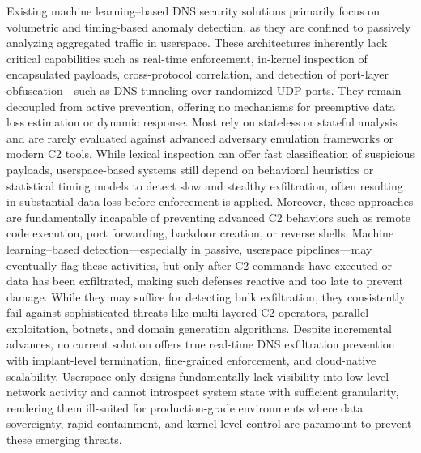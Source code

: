\documentclass [11pt, proquest] {uwthesis}[2020/02/24]
\begin{document}
Existing machine learning–based DNS security solutions primarily focus on volumetric and timing-based anomaly detection, as they are confined to passively analyzing aggregated traffic in userspace. These architectures inherently lack critical capabilities such as real-time enforcement, in-kernel inspection of encapsulated payloads, cross-protocol correlation, and detection of port-layer obfuscation—such as DNS tunneling over randomized UDP ports. They remain decoupled from active prevention, offering no mechanisms for preemptive data loss estimation or dynamic response. Most rely on stateless or stateful analysis and are rarely evaluated against advanced adversary emulation frameworks or modern C2 tools. While lexical inspection can offer fast classification of suspicious payloads, userspace-based systems still depend on behavioral heuristics or statistical timing models to detect slow and stealthy exfiltration, often resulting in substantial data loss before enforcement is applied. Moreover, these approaches are fundamentally incapable of preventing advanced C2 behaviors such as remote code execution, port forwarding, backdoor creation, or reverse shells. Machine learning–based detection—especially in passive, userspace pipelines—may eventually flag these activities, but only after C2 commands have executed or data has been exfiltrated, making such defenses reactive and too late to prevent damage. While they may suffice for detecting bulk exfiltration, they consistently fail against sophisticated threats like multi-layered C2 operators, parallel exploitation, botnets, and domain generation algorithms. Despite incremental advances, no current solution offers true real-time DNS exfiltration prevention with implant-level termination, fine-grained enforcement, and cloud-native scalability. Userspace-only designs fundamentally lack visibility into low-level network activity and cannot introspect system state with sufficient granularity, rendering them ill-suited for production-grade environments where data sovereignty, rapid containment, and kernel-level control are paramount to prevent these emerging threats.
\end{document}
